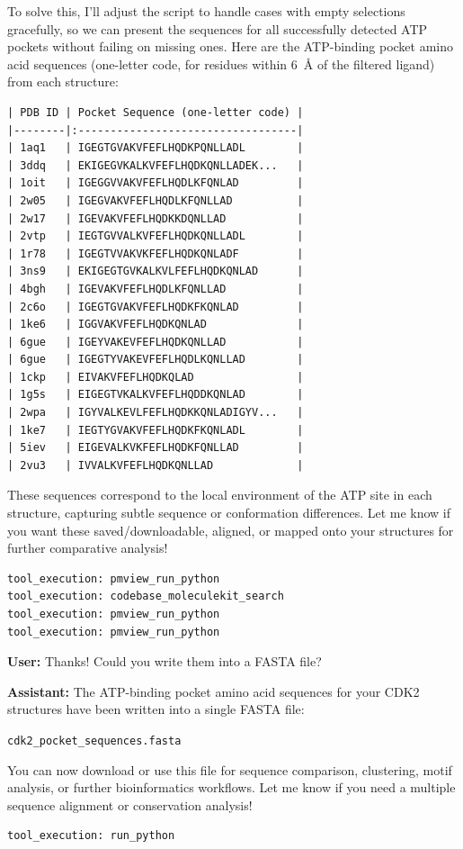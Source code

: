 \documentclass{article}
\begin{document}
\begin{assistantbox}
To solve this, I’ll adjust the script to handle cases with empty selections gracefully, so we can present the sequences for all successfully detected ATP pockets without failing on missing ones. Here are the ATP-binding pocket amino acid sequences (one-letter code, for residues within 6~\AA{} of the filtered ligand) from each structure:
\begin{verbatim}
| PDB ID | Pocket Sequence (one-letter code) |
|--------|:----------------------------------|
| 1aq1   | IGEGTGVAKVFEFLHQDKPQNLLADL        |
| 3ddq   | EKIGEGVKALKVFEFLHQDKQNLLADEK...   |
| 1oit   | IGEGGVVAKVFEFLHQDLKFQNLAD         |
| 2w05   | IGEGVAKVFEFLHQDLKFQNLLAD          |
| 2w17   | IGEVAKVFEFLHQDKKDQNLLAD           |
| 2vtp   | IEGTGVVALKVFEFLHQDKQNLLADL        |
| 1r78   | IGEGTVVAKVKFEFLHQDKQNLADF         |
| 3ns9   | EKIGEGTGVKALKVLFEFLHQDKQNLAD      |
| 4bgh   | IGEVAKVFEFLHQDLKFQNLLAD           |
| 2c6o   | IGEGTGVAKVFEFLHQDKFKQNLAD         |
| 1ke6   | IGGVAKVFEFLHQDKQNLAD              |
| 6gue   | IGEYVAKEVFEFLHQDKQNLLAD           |
| 6gue   | IGEGTYVAKEVFEFLHQDLKQNLLAD        |
| 1ckp   | EIVAKVFEFLHQDKQLAD                |
| 1g5s   | EIGEGTVKALKVFEFLHQDDKQNLAD        |
| 2wpa   | IGYVALKEVLFEFLHQDKKQNLADIGYV...   |
| 1ke7   | IEGTYGVAKVFEFLHQDKFKQNLADL        |
| 5iev   | EIGEVALKVKFEFLHQDKFQNLLAD         |
| 2vu3   | IVVALKVFEFLHQDKQNLLAD             |
\end{verbatim}
These sequences correspond to the local environment of the ATP site in each structure, capturing subtle sequence or conformation differences.
Let me know if you want these saved/downloadable, aligned, or mapped onto your structures for further comparative analysis!
\begin{verbatim}
tool_execution: pmview_run_python
tool_execution: codebase_moleculekit_search
tool_execution: pmview_run_python
tool_execution: pmview_run_python
\end{verbatim}
\end{assistantbox}

\vspace{1.5em}

\begin{userbox}
\textbf{User:} Thanks! Could you write them into a FASTA file?
\end{userbox}

\begin{assistantbox}
\textbf{Assistant:} The ATP-binding pocket amino acid sequences for your CDK2 structures have been written into a single FASTA file:

\texttt{cdk2\_pocket\_sequences.fasta}

You can now download or use this file for sequence comparison, clustering, motif analysis, or further bioinformatics workflows. Let me know if you need a multiple sequence alignment or conservation analysis!
\begin{verbatim}
tool_execution: run_python
\end{verbatim}
\end{assistantbox}
\end{document}
